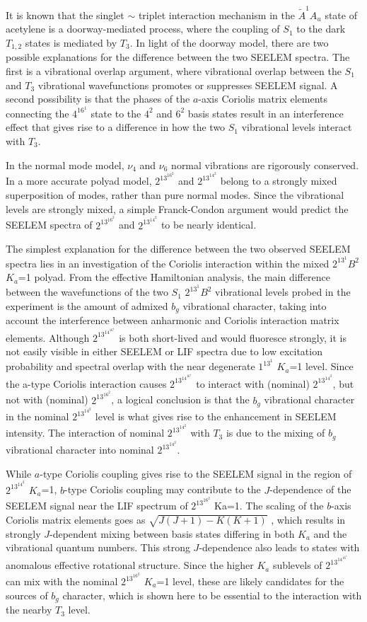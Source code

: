 \documentclass[12pt,draft]{mitthesis}
\begin{document}
It is known that the singlet $\sim$ triplet interaction mechanism in
the $\tilde{A}^1A_u$ state of acetylene is a doorway-mediated process,
where the coupling of $S_1$ to the dark $T_{1,2}$ states is mediated
by $T_3$.  In light of the doorway model, there are two possible
explanations for the difference between the two SEELEM spectra. The
first is a vibrational overlap argument, where vibrational overlap
between the $S_1$ and $T_3$ vibrational wavefunctions promotes or
suppresses SEELEM signal. A second possibility is that the phases of
the $a$-axis Coriolis matrix elements connecting the $4^16^1$ state to
the $4^2$ and $6^2$ basis states result in an interference effect that
gives rise to a difference in how the two $S_1$ vibrational levels
interact with $T_3$.

In the normal mode model, $\nu_4$ and $\nu_6$ normal vibrations are
rigorously conserved. In a more accurate polyad model, $2^13^16^2$ and
$2^13^14^2$ belong to a strongly mixed superposition of modes, rather
than pure normal modes. Since the vibrational levels are strongly
mixed, a simple Franck-Condon argument would predict the SEELEM
spectra of $2^13^16^2$ and $2^13^14^2$ to be nearly identical.

The simplest explanation for the difference between the two observed
SEELEM spectra lies in an investigation of the Coriolis interaction
within the mixed $2^13^1B^2$ $K_a$=1 polyad. From the effective
Hamiltonian analysis, the main difference between the wavefunctions of
the two $S_1$ $2^13^1B^2$ vibrational levels probed in the experiment
is the amount of admixed $b_g$ vibrational character, taking into account
the interference between anharmonic and Coriolis interaction matrix
elements. Although $2^13^14^16^1$ is both short-lived and would
fluoresce strongly, it is not easily visible in either SEELEM or LIF
spectra due to low excitation probability and spectral overlap with
the near degenerate $1^13^1$ $K_a$=1 level. Since the a-type Coriolis
interaction causes $2^13^14^16^1$ to interact with (nominal)
$2^13^14^2$, but not with (nominal) $2^13^16^2$, a logical conclusion
is that the $b_g$ vibrational character in the nominal $2^13^14^2$ level
is what gives rise to the enhancement in SEELEM intensity. The
interaction of nominal $2^13^14^2$ with $T_3$ is due to the mixing of
$b_g$ vibrational character into nominal $2^13^14^2$.

While $a$-type Coriolis coupling gives rise to the SEELEM signal in the
region of $2^13^14^2$ $K_a$=1, $b$-type Coriolis coupling may
contribute to the $J$-dependence of the SEELEM signal near the LIF
spectrum of $2^13^16^2$ Ka=1.  The scaling of the $b$-axis Coriolis
matrix elements goes as $\sqrt{J(J+1)-K(K+1)}$ , which results in strongly
$J$-dependent mixing between basis states differing in both $K_a$ and
the vibrational quantum numbers. This strong $J$-dependence also leads
to states with anomalous effective rotational structure. Since the
higher $K_a$ sublevels of $2^13^14^16^1$ can mix with the nominal
$2^13^16^2$ $K_a$=1 level, these are likely candidates for the sources
of $b_g$ character, which is shown here to be essential to the
interaction with the nearby $T_3$ level.
\end{document}
